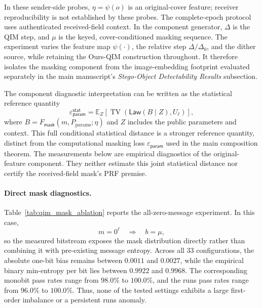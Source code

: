 \documentclass[journal]{IEEEtran}
\theoremstyle{definition}
\theoremstyle{game}
\begin{document}
In these sender-side probes, $\eta=\psi(o)$ is an original-cover feature;
receiver reproducibility is not established by these probes. The
complete-epoch protocol uses authenticated received-field context. In the
component generator,
$\Delta$ is the QIM step, and $\mu$ is the keyed, cover-conditioned masking
sequence. The experiment varies the feature map $\psi(\cdot)$, the relative
step $\Delta/\Delta_0$, and the dither source, while retaining the Ours-QIM
construction throughout. It therefore isolates the masking component from the
image-embedding footprint evaluated separately in the main manuscript's
\emph{Stego-Object Detectability Results} subsection.

The component diagnostic interpretation can be written as the statistical
reference quantity
\begin{equation}
 \varepsilon_{\mathsf{param}}^{\mathsf{stat}}
 =
 \mathbb{E}_{Z}
 \left[
 \operatorname{TV}
 \!\left(
 \mathsf{Law}(B\mid Z),
 U_{\ell}
 \right)
 \right],
 \label{eq:supp_epsilon_param}
\end{equation}
where $B=F_{\mathsf{mask}}(m,P_{\mathrm{params}};\eta)$ and $Z$ includes the
public parameters and context. This full conditional statistical distance
is a stronger reference quantity, distinct from the computational masking
loss $\varepsilon_{\mathsf{param}}$ used in the main composition theorem.
The measurements below are empirical diagnostics of the original-feature
component. They neither estimate this joint statistical distance nor
certify the received-field mask's PRF premise.

\paragraph{Direct mask diagnostics.}
Table~\ref{tab:qim_mask_ablation} reports the all-zero-message experiment. In
this case,
\begin{equation}
 m=0^{\ell}
 \quad\Longrightarrow\quad
 b=\mu,
 \label{eq:supp_zero_message}
\end{equation}
so the measured bitstream exposes the mask distribution directly rather than
combining it with pre-existing message entropy. Across all $33$ configurations,
the absolute one-bit bias remains between $0.0011$ and $0.0027$, while the
empirical binary min-entropy per bit lies between $0.9922$ and $0.9968$. The
corresponding monobit pass rates range from $98.0\%$ to $100.0\%$, and the runs
pass rates range from $96.0\%$ to $100.0\%$. Thus, none of the tested settings
exhibits a large first-order imbalance or a persistent runs anomaly.
\end{document}
